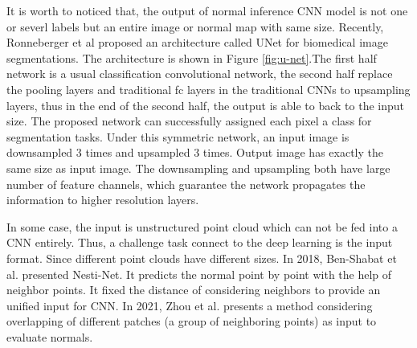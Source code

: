 It is worth to noticed that, the output of normal inference CNN model is not one or severl labels but an entire image or normal map with same size. 
Recently, Ronneberger et al proposed an architecture called UNet \cite{unet} for biomedical image segmentations. The architecture is shown in Figure \ref{fig:u-net}.The first half network is a usual classification convolutional network, the second half replace the pooling layers and traditional fc layers in the traditional CNNs to upsampling layers, thus in the end of the second half, the output is able to back to the input size. The proposed network can successfully assigned each pixel a class for segmentation tasks. Under this symmetric network, an input image is downsampled 3 times and upsampled 3 times. Output image has exactly the same size as input image. The downsampling and upsampling both have large number of feature channels, which guarantee the network propagates the information to higher resolution layers.





In some case, the input is unstructured point cloud which can not be fed into a CNN entirely. Thus, a challenge task connect to the deep learning is the input format. Since different point clouds have different sizes. 
In 2018, Ben-Shabat et al. \cite{Ben-Shabat_2019_CVPR} presented Nesti-Net. It predicts the normal point by point with the help of neighbor points. It fixed the distance of considering neighbors to provide an unified input for CNN. In 2021, Zhou et al. \cite{zhou2021fast} presents a method considering overlapping of different patches (a group of neighboring points) as input to evaluate normals. 
